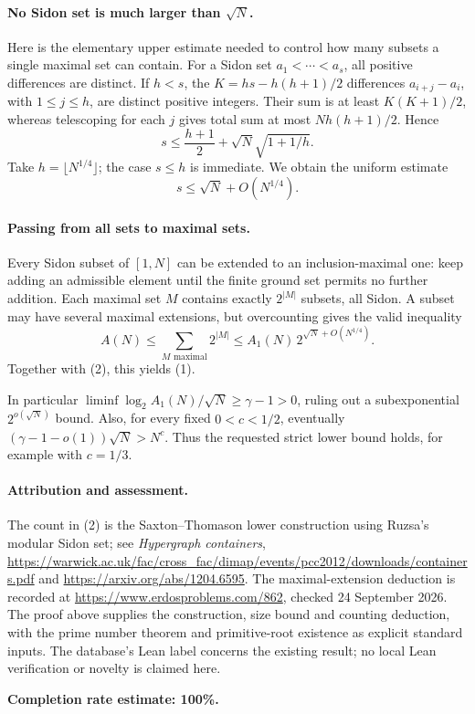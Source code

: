 \paragraph{No Sidon set is much larger than \(\sqrt N\).}
Here is the elementary upper estimate needed to control how many subsets a single maximal set can contain. For a Sidon set \(a_1<\cdots<a_s\), all positive differences are distinct. If \(h<s\), the
\(K=hs-h(h+1)/2\) differences \(a_{i+j}-a_i\), with \(1\leq j\leq h\), are distinct positive integers. Their sum is at least \(K(K+1)/2\), whereas telescoping for each \(j\) gives total sum at most \(Nh(h+1)/2\). Hence
\[
 s\leq\frac{h+1}{2}+\sqrt N\sqrt{1+1/h}.
\]
Take \(h=\lfloor N^{1/4}\rfloor\); the case \(s\leq h\) is immediate. We obtain the uniform estimate
\[
 s\leq\sqrt N+O(N^{1/4}).
\tag{3}
\]

\paragraph{Passing from all sets to maximal sets.}
Every Sidon subset of \([1,N]\) can be extended to an inclusion-maximal one: keep adding an admissible element until the finite ground set permits no further addition. Each maximal set \(M\) contains exactly \(2^{|M|}\) subsets, all Sidon. A subset may have several maximal extensions, but overcounting gives the valid inequality
\[
 A(N)\leq\sum_{M\text{ maximal}}2^{|M|}
 \leq A_1(N)\,2^{\sqrt N+O(N^{1/4})}.
\]
Together with (2), this yields (1).

In particular \(\liminf \log_2A_1(N)/\sqrt N\geq\gamma-1>0\), ruling out a subexponential \(2^{o(\sqrt N)}\) bound. Also, for every fixed \(0<c<1/2\), eventually \((\gamma-1-o(1))\sqrt N>N^c\). Thus the requested strict lower bound holds, for example with \(c=1/3\).

\paragraph{Attribution and assessment.}
The count in (2) is the Saxton--Thomason lower construction using Ruzsa's modular Sidon set; see \emph{Hypergraph containers}, \url{https://warwick.ac.uk/fac/cross_fac/dimap/events/pcc2012/downloads/containers.pdf} and \url{https://arxiv.org/abs/1204.6595}. The maximal-extension deduction is recorded at \url{https://www.erdosproblems.com/862}, checked 24 September 2026. The proof above supplies the construction, size bound and counting deduction, with the prime number theorem and primitive-root existence as explicit standard inputs. The database's Lean label concerns the existing result; no local Lean verification or novelty is claimed here.

\textbf{Completion rate estimate: 100\%.}
